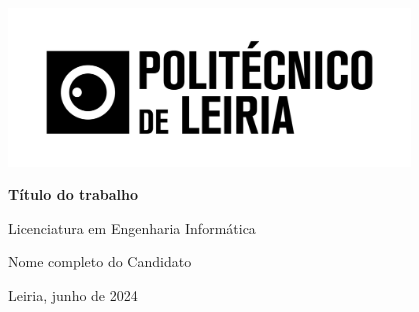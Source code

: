 \documentclass[a4paper,12pt,twoside]{report}
\begin{document}
	\begin{titlepage}
		\centering
		\includegraphics[width=0.8\textwidth]{imagens/logo.png} %
		\vspace*{1cm}
		
		\Huge
		\textbf{Título do trabalho}
		
		\vspace{1.5cm}
		
		\LARGE
		Licenciatura em Engenharia Informática
		
		\vfill
		
		\Large
		Nome completo do Candidato
		
		\vspace{0.8cm}
		
		\normalsize
		Leiria, junho de 2024
		
		
		\vspace{1.5cm}
	\end{titlepage}
	
\end{document}
